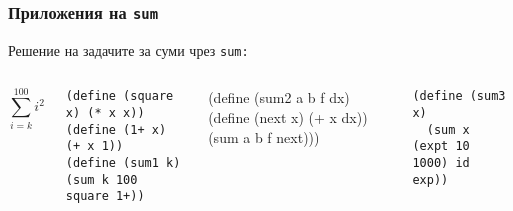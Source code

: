 \documentclass{beamer}
\begin{document}
\begin{frame}[fragile]
  \frametitle{Приложения на \tt{sum}}

  Решение на задачите за суми чрез \tt{sum}:

  \begin{columns}[t,onlytextwidth]

    \begin{equation*}
      \sum_{i=k}^{100} i^2
    \end{equation*}




\begin{verbatim}
(define (square x) (* x x))
(define (1+ x) (+ x 1))
(define (sum1 k) (sum k 100 square 1+))
\end{verbatim}

\begin{semiverbatim}
(define (sum2 a b f dx)
  (define (next x) (+ x dx))
  (sum a b f next)))
\end{semiverbatim}

\begin{verbatim}
(define (sum3 x)
  (sum x (expt 10 1000) id exp))
\end{verbatim}

  \end{columns}
\end{frame}
\end{document}
